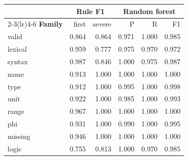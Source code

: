 \begin{tabular}{lrrrrr}
\toprule
 & \multicolumn{2}{c}{\textbf{Rule F1}} & \multicolumn{3}{c}{\textbf{Random forest}}\\
\cmidrule(lr){2-3}\cmidrule(lr){4-6}
\textbf{Family} & first & severe & P & R & F1\\
\midrule
valid & 0.864 & 0.864 & 0.971 & 1.000 & 0.985\\
lexical & 0.959 & 0.777 & 0.975 & 0.970 & 0.972\\
syntax & 0.987 & 0.846 & 1.000 & 0.975 & 0.987\\
name & 0.913 & 1.000 & 1.000 & 1.000 & 1.000\\
type & 0.912 & 1.000 & 0.995 & 1.000 & 0.998\\
unit & 0.922 & 1.000 & 0.985 & 1.000 & 0.993\\
range & 0.967 & 1.000 & 1.000 & 1.000 & 1.000\\
phi & 0.931 & 1.000 & 0.990 & 1.000 & 0.995\\
missing & 0.946 & 1.000 & 1.000 & 1.000 & 1.000\\
logic & 0.755 & 0.813 & 1.000 & 0.970 & 0.985\\\bottomrule
\end{tabular}
